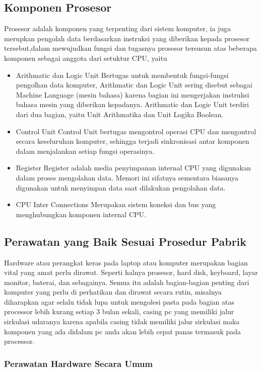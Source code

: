 \subsection{Komponen Prosesor}
Prosesor adalah komponen yang terpenting dari sistem komputer, ia juga merupkan pengolah data berdasarkan instruksi yang diberikan kepada
prosesor tersebut,dalam mewujudkan fungsi dan tugasnya prosesor tersusun atas beberapa komponen sebagai anggota dari setuktur CPU, yaitu

\begin{itemize}
	\item Arithmatic dan Logic Unit
	Bertugas untuk membentuk fungsi-fungsi pengolhan data komputer, Arithmatic dan Logic Unit sering disebut sebagai Machine Language
	(mesin bahasa) karena bagian ini mengerjakan instruksi bahasa mesin yang diberikan kepadanya. Arithmatic dan Logic Unit terdiri
	dari dua bagian, yaitu Unit Arithmatika dan Unit Logika Boolean.
	\item Control Unit
	Control Unit bertugas mengontrol operasi CPU dan mengontrol secara keseluruhan komputer, sehingga terjadi sinkronisasi antar komponen
	dalam menjalankan setiap fungsi operasinya.
	\item Register
	Register adalah media penyimpanan internal CPU yang digunakan dalam proses mengolahan data. Memori ini sifatnya sementara biasanya
	digunakan untuk menyimpan data saat dilakukan pengolahan data.
	\item CPU Inter Connections
	Merupakan sistem koneksi dan bus yang menghubungkan komponen internal CPU.
\end{itemize}

\subsection{Perawatan yang Baik Sesuai Prosedur Pabrik}
Hardware atau perangkat keras pada laptop atau komputer merupakan bagian vital yang amat perlu dirawat. 
Seperti halnya prosesor, hard disk, keyboard, layar monitor, baterai, dan sebagainya. 
Semua itu adalah bagian-bagian penting dari komputer yang perlu di perhatikan dan dirawat secara rutin, misalnya
diharapkan agar selalu tidak lupa untuk mengolesi pasta pada bagian atas processor lebih kurang setiap 3 bulan sekali,
casing pc yang memiliki jalur sirkulasi udaranya karena apabila casing tidak memiliki jalur sirkulasi maka komponen yang 
ada didalam pc anda akan lebih cepat panas termasuk pada processor. 


\subsubsection{Perawatan Hardware Secara Umum}


